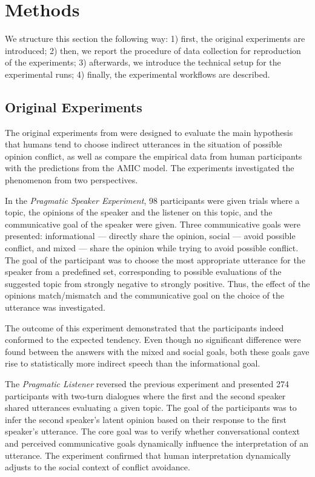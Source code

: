 \documentclass[11pt]{article}
\begin{document}
\section{Methods}
\label{sec:methods}

We structure this section the following way: 1) first, the original experiments are introduced; 2) then, we report the procedure of data collection for reproduction of the experiments; 3) afterwards, we introduce the technical setup for the experimental runs; 4) finally, the experimental workflows are described.

\subsection{Original Experiments}
\label{sec:orig}

The original experiments from \citet{achimova-2025} were designed to evaluate the main hypothesis that humans tend to choose indirect utterances in the situation of possible opinion conflict, as well as compare the empirical data from human participants with the predictions from the AMIC model. The experiments investigated the phenomenon from two perspectives.

In the \textit{Pragmatic Speaker Experiment}, 98 participants were given trials where a topic, the opinions of the speaker and the listener on this topic, and the communicative goal of the speaker were given. Three communicative goals were presented: informational --- directly share the opinion, social --- avoid possible conflict, and mixed --- share the opinion while trying to avoid possible conflict. The goal of the participant was to choose the most appropriate utterance for the speaker from a predefined set, corresponding to possible evaluations of the suggested topic from strongly negative to strongly positive. Thus, the effect of the opinions match/mismatch and the communicative goal on the choice of the utterance was investigated.

The outcome of this experiment demonstrated that the participants indeed conformed to the expected tendency. Even though no significant difference were found between the answers with the mixed and social goals, both these goals gave rise to statistically more indirect speech than the informational goal.

The \textit{Pragmatic Listener} reversed the previous experiment and presented 274 participants with two-turn dialogues where the first and the second speaker shared utterances evaluating a given topic. The goal of the participants was to infer the second speaker's latent opinion based on their response to the first speaker's utterance. The core goal was to verify whether conversational context and perceived communicative goals dynamically influence the interpretation of an utterance. The experiment confirmed that human interpretation dynamically adjusts to the social context of conflict avoidance. 
\end{document}
